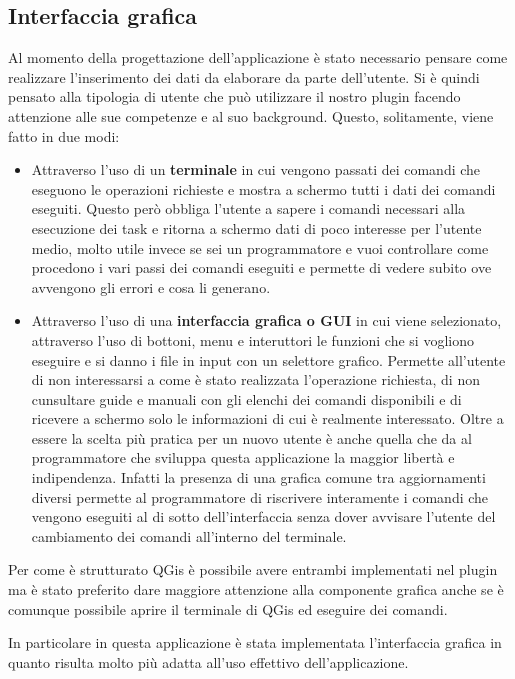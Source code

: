 \subsection{Interfaccia grafica}
Al momento della progettazione dell'applicazione è stato necessario pensare come realizzare l'inserimento dei dati da elaborare da parte dell'utente. 
Si è quindi pensato alla tipologia di utente che può utilizzare il nostro plugin facendo attenzione alle sue competenze e al suo background.
Questo, solitamente, viene fatto in due modi:
\begin{itemize}

\item Attraverso l'uso di un \textbf{terminale} in cui vengono passati dei comandi che eseguono le operazioni richieste e mostra a schermo tutti i dati dei comandi eseguiti. Questo però obbliga l'utente a sapere i comandi necessari alla esecuzione dei task e ritorna a schermo dati di poco interesse per l'utente medio, molto utile invece se sei un programmatore e vuoi controllare come procedono i vari passi dei comandi eseguiti e permette di vedere subito ove avvengono gli errori e cosa li generano.

\item Attraverso l'uso di una \textbf{interfaccia grafica o GUI} in cui viene selezionato, attraverso l'uso di bottoni, menu e interuttori le funzioni che si vogliono eseguire e si danno i file in input con un selettore grafico. Permette all'utente di non interessarsi a come è stato realizzata l'operazione richiesta, di non cunsultare guide e manuali con gli elenchi dei comandi disponibili e di ricevere a schermo solo le informazioni di cui è realmente interessato. Oltre a essere la scelta più pratica per un nuovo utente è anche quella che da al programmatore che sviluppa questa applicazione la maggior libertà e indipendenza. Infatti la presenza di una grafica comune tra aggiornamenti diversi permette al programmatore di riscrivere interamente i comandi che vengono eseguiti al di sotto dell'interfaccia senza dover avvisare l'utente del cambiamento dei comandi all'interno del terminale.

\end{itemize}

Per come è strutturato QGis è possibile avere entrambi implementati nel plugin ma è stato preferito dare maggiore attenzione alla componente grafica anche se è comunque possibile aprire il terminale di QGis ed eseguire dei comandi.

In particolare in questa applicazione è stata implementata l'interfaccia grafica in quanto risulta molto più adatta all'uso effettivo dell'applicazione.


